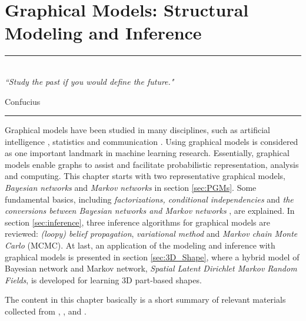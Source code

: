 
\chapter{Graphical Models: Structural Modeling and Inference} %

\label{Chapter2} %


\rule{\textwidth}{0.4pt} \\[0.5cm]
\textit{``Study the past if you would define the future."}

\begin{flushright}
Confucius
\end{flushright}
\rule{\textwidth}{0.4pt} 


Graphical models have been studied in many disciplines, such as artificial intelligence \citep{pearl_book}, statistics \citep{lauritzen_book} and communication \citep{MRF_communication}.  
Using graphical models is considered as one important landmark in machine learning research. Essentially, graphical models enable graphs to assist and facilitate probabilistic representation, 
analysis and computing. This chapter starts with two representative graphical models, \emph{Bayesian networks} and \emph{Markov networks} in section \ref{sec:PGMs}. Some fundamental basics, 
including \emph{factorizations, conditional independencies} and \emph{the conversions between Bayesian networks and Markov networks} , are explained. In section \ref{sec:inference}, three inference 
algorithms for graphical models are reviewed: \emph{(loopy) belief propagation}, \emph{variational method} and \emph{Markov chain Monte Carlo} (MCMC). 
At last, an application of the modeling and inference with graphical models is presented in section \ref{sec:3D_Shape}, where a hybrid model of Bayesian network and Markov network, \emph{Spatial Latent 
Dirichlet Markov Random Fields}, is developed for learning 3D part-based shapes.             

The content in this chapter basically is a short summary of relevant materials collected from \cite{MLPR_book}, \cite{Barber_book}, \cite{Koller09} and \cite{Wainwright_book}.                   



